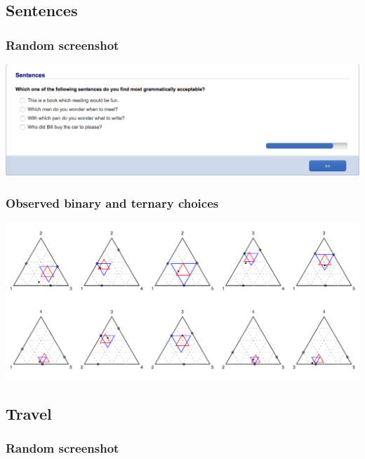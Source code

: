 \documentclass[11pt,letter]{article}
\begin{document}
\pagebreak

\subsection*{Sentences}



\subsubsection*{Random screenshot}

\includegraphics[width=15cm]{Population_study_design/screenshot_Sentences.png}

\subsubsection*{Observed binary and ternary choices}

\includegraphics[width=15cm]{./Population_study_data/Simplexes/Sentences.pdf}

\pagebreak

\subsection*{Travel}



\subsubsection*{Random screenshot}
\end{document}
